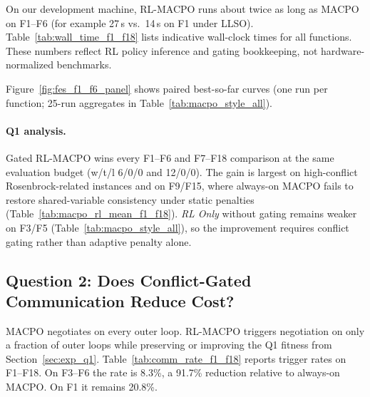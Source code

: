 \documentclass[conference]{IEEEtran}
\begin{document}
On our development machine, RL-MACPO runs about twice as long as MACPO on F1--F6 (for example 27\,s vs.\ 14\,s on F1 under LLSO). Table~\ref{tab:wall_time_f1_f18} lists indicative wall-clock times for all functions. These numbers reflect RL policy inference and gating bookkeeping, not hardware-normalized benchmarks.

Figure~\ref{fig:fes_f1_f6_panel} shows paired best-so-far curves (one run per function; 25-run aggregates in Table~\ref{tab:macpo_style_all}).

\paragraph{Q1 analysis.} Gated RL-MACPO wins every F1--F6 and F7--F18 comparison at the same evaluation budget (w/t/l 6/0/0 and 12/0/0). The gain is largest on high-conflict Rosenbrock-related instances and on F9/F15, where always-on MACPO fails to restore shared-variable consistency under static penalties (Table~\ref{tab:macpo_rl_mean_f1_f18}). \emph{RL Only} without gating remains weaker on F3/F5 (Table~\ref{tab:macpo_style_all}), so the improvement requires conflict gating rather than adaptive penalty alone.

\subsection{Question 2: Does Conflict-Gated Communication Reduce Cost?}\label{sec:exp_q2}
MACPO negotiates on every outer loop. RL-MACPO triggers negotiation on only a fraction of outer loops while preserving or improving the Q1 fitness from Section~\ref{sec:exp_q1}. Table~\ref{tab:comm_rate_f1_f18} reports trigger rates on F1--F18. On F3--F6 the rate is 8.3\%, a 91.7\% reduction relative to always-on MACPO. On F1 it remains 20.8\%.
\end{document}
